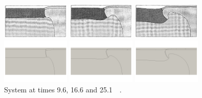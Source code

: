 \begin{center}
\includegraphics[width=3.25cm]{python_codes/fieldstone_118/images/case2/a}
\includegraphics[width=3.25cm]{python_codes/fieldstone_118/images/case2/b}
\includegraphics[width=3.25cm]{python_codes/fieldstone_118/images/case2/c}\\
\includegraphics[width=3.25cm]{python_codes/fieldstone_118/results/case2/a}
\includegraphics[width=3.25cm]{python_codes/fieldstone_118/results/case2/b}
\includegraphics[width=3.25cm]{python_codes/fieldstone_118/results/case2/c}\\
{\captionfont System at times 9.6, 16.6 and 25.1~\si{\mega\year}.}
\end{center}

